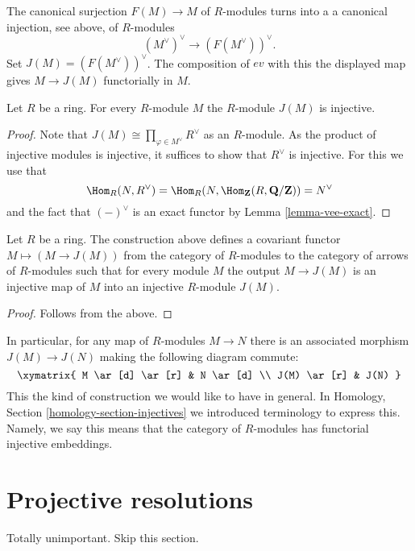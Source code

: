 \noindent
The canonical surjection $F(M) \to M$ of $R$-modules turns into a
a canonical injection, see above, of $R$-modules
$$
(M^\vee)^\vee \longrightarrow (F(M^\vee))^\vee.
$$
Set $J(M) = (F(M^\vee))^\vee$. The composition of $ev$ with this
the displayed map gives $M \to J(M)$ functorially in $M$.

\begin{lemma}
\label{lemma-JM-injective}
Let $R$ be a ring. For every $R$-module $M$ the
$R$-module $J(M)$ is injective.
\end{lemma}

\begin{proof}
Note that $J(M) \cong \prod_{\varphi \in M^\vee} R^\vee$ as an $R$-module.
As the product of injective modules is injective, it suffices to
show that $R^\vee$ is injective. For this we use that
$$
\Hom_R(N, R^\vee) =
\Hom_R(N, \Hom_{\mathbf{Z}}(R, \mathbf{Q}/\mathbf{Z})) =
N^\vee
$$
and the
fact that $(-)^\vee$ is an exact functor by Lemma
\ref{lemma-vee-exact}.
\end{proof}

\begin{lemma}
\label{lemma-injectives-modules}
Let $R$ be a ring.
The construction above defines a covariant functor
$M \mapsto (M \to J(M))$ from the category of
$R$-modules to the category of arrows of $R$-modules
such that for every module $M$ the output
$M \to J(M)$ is an injective map of $M$ into
an injective $R$-module $J(M)$.
\end{lemma}

\begin{proof}
Follows from the above.
\end{proof}

\noindent
In particular, for any map of $R$-modules $M \to N$
there is an associated morphism $J(M) \to J(N)$
making the following diagram commute:
$$
\xymatrix{
M \ar[d] \ar[r] & N \ar[d] \\
J(M) \ar[r] & J(N) }
$$
This the kind of construction we would like to have in general.
In Homology, Section \ref{homology-section-injectives}
we introduced terminology to express this. Namely,
we say this means that the category of $R$-modules
has functorial injective embeddings.

\section{Projective resolutions}
\label{section-projective-resolution}

\noindent
Totally unimportant. Skip this section.

